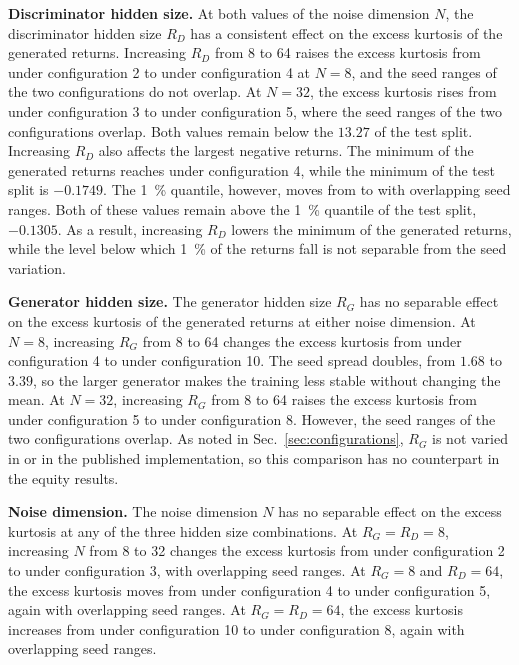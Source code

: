 \textbf{Discriminator hidden size.} At both values of the noise dimension $N$, the discriminator hidden size $R_D$ has a consistent effect on the excess kurtosis of the generated returns. Increasing $R_D$ from \num{8} to \num{64} raises the excess kurtosis from  under configuration 2 to  under configuration 4 at $N = 8$, and the seed ranges of the two configurations do not overlap. At $N=32$, the excess kurtosis rises from  under configuration 3 to  under configuration 5, where the seed ranges of the two configurations overlap. Both values remain below the $13.27$ of the test split. Increasing $R_D$ also affects the largest negative returns. The minimum of the generated returns reaches  under configuration 4, while the minimum of the test split is $-0.1749$. The \SI{1}{\percent} quantile, however, moves from  to  with overlapping seed ranges. Both of these values remain above the \SI{1}{\percent} quantile of the test split, $-0.1305$. As a result, increasing $R_D$ lowers the minimum of the generated returns, while the level below which \SI{1}{\percent} of the returns fall is not separable from the seed variation.

\textbf{Generator hidden size.} The generator hidden size $R_G$ has no separable effect on the excess kurtosis of the generated returns at either noise dimension.
At $N=8$, increasing $R_G$ from 8 to 64 changes the excess kurtosis from  under configuration 4 to  under configuration 10. The seed spread doubles, from $1.68$ to $3.39$, so the larger generator makes the training less stable without changing the mean. At $N=32$, increasing $R_G$ from 8 to 64 raises the excess kurtosis from  under configuration 5 to  under configuration 8. However, the seed ranges of the two configurations overlap.
As noted in Sec.~\ref{sec:configurations}, $R_G$ is not varied in \textcite{vuleticFinGANForecastingClassifying2024} or in the published implementation, so this comparison has no counterpart in the equity results.

\textbf{Noise dimension.} The noise dimension $N$ has no separable effect on the excess kurtosis at any of the three hidden size combinations. At $R_G = R_D = 8$, increasing $N$ from 8 to 32 changes the excess kurtosis from  under configuration 2 to  under configuration 3, with overlapping seed ranges. At $R_G = 8$ and $R_D = 64$, the excess kurtosis moves from  under configuration 4 to  under configuration 5, again with overlapping seed ranges. At $R_G = R_D = 64$, the excess kurtosis increases from  under configuration 10 to  under configuration 8, again with overlapping seed ranges.

